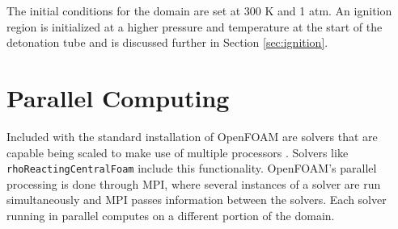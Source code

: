 The initial conditions for the domain are set at 300 K and 1 atm. An ignition region is initialized at a higher pressure and temperature at the start of the detonation tube and is discussed further in Section \ref{sec:ignition}.




\section{Parallel Computing}
Included with the standard installation of OpenFOAM are solvers that are capable being scaled to make use of multiple processors \cite{ofug}. Solvers like \verb|rhoReactingCentralFoam| include this functionality. OpenFOAM's parallel processing is done through MPI, where several instances of a solver are run simultaneously and MPI passes information between the solvers. Each solver running in parallel computes on a different portion of the domain. 

